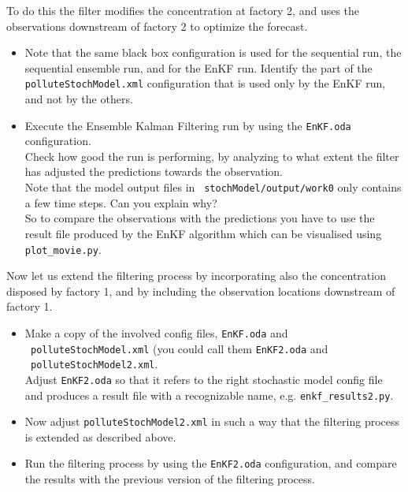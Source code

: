 To do this the filter modifies the concentration at factory 2, and uses the
observations downstream of factory 2 to optimize the forecast.

\begin{itemize}
 \item Note that the same black box configuration is used for the sequential
   run, the sequential ensemble run, and for the EnKF run. Identify the part of
   the {\tt polluteStochModel.xml} configuration that is used only by the EnKF
   run, and not by the others.
 \item Execute the Ensemble Kalman Filtering run by using the {\tt EnKF.oda}
   configuration.\\ Check how good the run is performing, by analyzing to what
   extent the filter has adjusted the predictions towards the
   observation.\\ Note that the model output files in {\tt
     stochModel/output/work0} only contains a few time steps. Can you explain
   why?\\ So to compare the observations with the predictions you have to use
   the result file produced by the EnKF algorithm which can be visualised using
   {\tt plot\_movie.py}.
\end{itemize}

Now let us extend the filtering process by incorporating also the concentration
disposed by factory 1, and by including the observation locations downstream of
factory 1.

\begin{itemize}
 \item Make a copy of the involved config files, {\tt EnKF.oda} and \\{\tt
   polluteStochModel.xml} (you could call them {\tt EnKF2.oda} and\\ {\tt
   polluteStochModel2.xml}.\\ Adjust {\tt EnKF2.oda} so that it refers to the
   right stochastic model config file and produces a result file with a
   recognizable name, e.g. {\tt enkf\_results2.py}.
 \item Now adjust {\tt polluteStochModel2.xml} in such a way that the filtering
   process is extended as described above.
 \item Run the filtering process by using the {\tt EnKF2.oda} configuration,
   and compare the results with the previous version of the filtering process.
\end{itemize}

